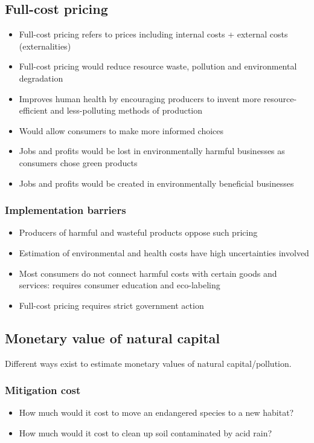 \documentclass{article}
\begin{document}
\subsection{Full-cost pricing}
\begin{itemize}
    \item Full-cost pricing refers to prices including internal costs + external costs (externalities)
    \item Full-cost pricing would reduce resource waste, pollution and environmental degradation
    \item Improves human health by encouraging producers to invent more resource-efficient and less-polluting methods of production
    \item Would allow consumers to make more informed choices
    \item Jobs and profits would be lost in environmentally harmful businesses as consumers chose green products
    \item Jobs and profits would be created in environmentally beneficial businesses
\end{itemize}

\subsubsection{Implementation barriers}
\begin{itemize}
    \item Producers of harmful and wasteful products oppose such pricing
    \item Estimation of environmental and health costs have high uncertainties involved
    \item Most consumers do not connect harmful costs with certain goods and services: requires consumer education and eco-labeling
    \item Full-cost pricing requires strict government action
\end{itemize}

\subsection{Monetary value of natural capital}
Different ways exist to estimate monetary values of natural capital/pollution.

\subsubsection{Mitigation cost}
\begin{itemize}
    \item How much would it cost to move an endangered species to a new habitat?
    \item How much would it cost to clean up soil contaminated by acid rain?
\end{itemize}
\end{document}
